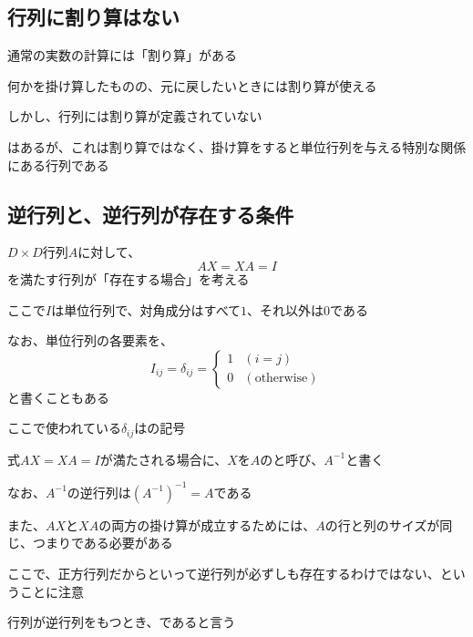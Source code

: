 \documentclass[../book_half_step_linear]{subfiles}
\begin{document}
\sectionline
\subsection{行列に割り算はない}

通常の実数の計算には「割り算」がある

何かを掛け算したものの、元に戻したいときには割り算が使える

\br

しかし、行列には割り算が定義されていない

はあるが、これは割り算ではなく、掛け算をすると単位行列を与える特別な関係にある行列である

\sectionline
\subsection{逆行列と、逆行列が存在する条件}

$D\times D$行列$A$に対して、
\begin{equation*}
  AX = XA = I
\end{equation*}
を満たす行列が「存在する場合」を考える

\br

ここで$I$は単位行列で、対角成分はすべて$1$、それ以外は$0$である

なお、単位行列の各要素を、
\begin{equation*}
  I_{ij} = \delta_{ij} = \begin{cases}
    1 & (i=j)              \\
    0 & (\text{otherwise})
  \end{cases}
\end{equation*}
と書くこともある

ここで使われている$\delta_{ij}$はの記号

\br

式$AX = XA = I$が満たされる場合に、$X$を$A$のと呼び、$A^{-1}$と書く

なお、$A^{-1}$の逆行列は$\left( A^{-1} \right)^{-1} = A$である

\br

また、$AX$と$XA$の両方の掛け算が成立するためには、$A$の行と列のサイズが同じ、つまりである必要がある

\br

ここで、正方行列だからといって逆行列が必ずしも存在するわけではない、ということに注意

行列が逆行列をもつとき、であると言う
\end{document}
